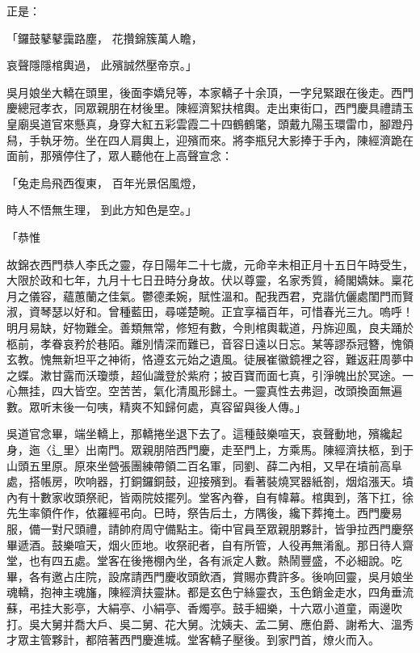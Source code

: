 \begin{showcontents}{}
正是：

「鑼鼓鼕鼕靄路塵，  花攢錦簇萬人瞻，

哀聲隱隱棺輿過，  此殯誠然壓帝京。」

吳月娘坐大轎在頭里，後面李嬌兒等，本家轎子十余頂，一字兒緊跟在後走。西門慶總冠孝衣，同眾親朋在材後里。陳經濟絮扶棺輿。走出東街口，西門慶具禮請玉皇廟吳道官來懸真，身穿大紅五彩雲霞二十四鶴鶴氅，頭戴九陽玉環雷巾，腳蹬丹舄，手執牙笏。坐在四人肩輿上，迎殯而來。將李瓶兒大影捧于手內，陳經濟跪在面前，那殯停住了，眾人聽他在上高聲宣念：

「兔走烏飛西復東，  百年光景侶風燈，

時人不悟無生理，  到此方知色是空。」

「恭惟

故錦衣西門恭人李氏之靈，存日陽年二十七歲，元命辛未相正月十五日午時受生，大限於政和七年，九月十七日丑時分身故。伏以尊靈，名家秀質，綺閣嬌妹。稟花月之儀容，蘊蕙蘭之佳氣。鬱德柔婉，賦性溫和。配我西君，克諧伉儷處閨門而賢淑，資琴瑟以好和。曾種藍田，尋嗟楚畹。正宜享福百年，可惜春光三九。嗚呼！明月易缺，好物難全。善類無常，修短有數，今則棺輿載道，丹旆迎風，良夫踊於柩前，孝眷哀矜於巷陌。離別情深而難已，音容日遠以日忘。某等謬忝冠簪，愧領玄教。愧無新坦平之神術，恪遵玄元始之遺風。徒展崔徽鏡裡之容，難返莊周夢中之蝶。漱甘露而沃瓊漿，超仙識登於紫府；披百寶而面七真，引淨魄出於冥途。一心無挂，四大皆空。空苦苦，氣化清風形歸土。一靈真性去弗迴，改頭換面無遍數。眾听末後一句咦，精爽不知歸何處，真容留與後人傳。」

吳道官念畢，端坐轎上，那轎捲坐退下去了。這種鼓樂喧天，哀聲動地，殯纔起身，迤〈辶里〉出南門。眾親朋陪西門慶，走至門上，方乘馬。陳經濟扶柩，到于山頭五里原。原來坐營張團練帶領二百名軍，同劉、薛二內相，又早在墳前高阜處，搭帳房，吹响器，打銅鑼銅鼓，迎接殯到。看著裝燒冥器紙劄，烟焰漲天。墳內有十數家收頭祭祀，皆兩院妓擺列。堂客內眷，自有幃幕。棺輿到，落下扛，徐先生率領仵作，依羅經弔向。巳時，祭告后土，方隅後，纔下葬掩土。西門慶易服，備一對尺頭禮，請帥府周守備點主。衛中官員至眾親朋夥計，皆爭拉西門慶祭畢遞酒。鼓樂喧天，烟火匝地。收祭祀者，自有所管，人役再無淆亂。那日待人齋堂，也有四五處。堂客在後捲棚內坐，各有派定人數。熱鬧豐盛，不必細說。吃畢，各有邀占庄院，設席請西門慶收頭飲酒，賞賜亦費許多。後响回靈，吳月娘坐魂轎，抱神主魂旛，陳經濟扶靈牀。都是玄色宁絲靈衣，玉色銷金走水，四角垂流蘇，弔挂大影亭，大絹亭、小絹亭、香燭亭。鼓手細樂，十六眾小道童，兩邊吹打。吳大舅并喬大戶、吳二舅、花大舅。沈姨夫、孟二舅、應伯爵、謝希大、溫秀才眾主管夥計，都陪著西門慶進城。堂客轎子壓後。到家門首，燎火而入。


\end{showcontents}
